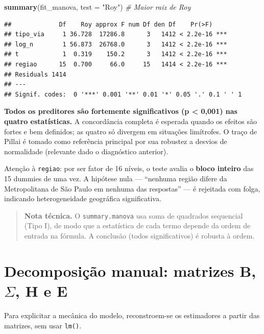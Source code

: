 \documentclass[
  11pt,
]{article}
\newenvironment{Shaded}{\begin{snugshade}}{\end{snugshade}}
\newcommand{\AttributeTok}[1]{\textcolor[rgb]{0.13,0.29,0.53}{#1}}
\newcommand{\CommentTok}[1]{\textcolor[rgb]{0.56,0.35,0.01}{\textit{#1}}}
\newcommand{\FunctionTok}[1]{\textcolor[rgb]{0.13,0.29,0.53}{\textbf{#1}}}
\newcommand{\NormalTok}[1]{#1}
\newcommand{\StringTok}[1]{\textcolor[rgb]{0.31,0.60,0.02}{#1}}
\begin{document}
\begin{Shaded}
\begin{Highlighting}[]
\FunctionTok{summary}\NormalTok{(fit\_manova, }\AttributeTok{test =} \StringTok{"Roy"}\NormalTok{)               }\CommentTok{\# Maior raiz de Roy}
\end{Highlighting}
\end{Shaded}

\begin{verbatim}
##             Df    Roy approx F num Df den Df    Pr(>F)    
## tipo_via     1 36.728  17286.8      3   1412 < 2.2e-16 ***
## log_n        1 56.873  26768.0      3   1412 < 2.2e-16 ***
## t            1  0.319    150.2      3   1412 < 2.2e-16 ***
## regiao      15  0.700     66.0     15   1414 < 2.2e-16 ***
## Residuals 1414                                            
## ---
## Signif. codes:  0 '***' 0.001 '**' 0.01 '*' 0.05 '.' 0.1 ' ' 1
\end{verbatim}

\textbf{Todos os preditores são fortemente significativos (p \textless{}
0,001) nas quatro estatísticas.} A concordância completa é esperada
quando os efeitos são fortes e bem definidos; as quatro só divergem em
situações limítrofes. O traço de Pillai é tomado como referência
principal por sua robustez a desvios de normalidade (relevante dado o
diagnóstico anterior).

Atenção à \texttt{regiao}: por ser fator de 16 níveis, o teste avalia o
\textbf{bloco inteiro} das 15 dummies de uma vez. A hipótese nula ---
``nenhuma região difere da Metropolitana de São Paulo em nenhuma das
respostas'' --- é rejeitada com folga, indicando heterogeneidade
geográfica significativa.

\begin{quote}
\textbf{Nota técnica.} O \texttt{summary.manova} usa soma de quadrados
sequencial (Tipo I), de modo que a estatística de cada termo depende da
ordem de entrada na fórmula. A conclusão (todos significativos) é
robusta à ordem.
\end{quote}

\newpage

\section{\texorpdfstring{Decomposição manual: matrizes B, \(\Sigma\), H
e
E}{Decomposição manual: matrizes B, \textbackslash Sigma, H e E}}\label{decomposiuxe7uxe3o-manual-matrizes-b-sigma-h-e-e}

Para explicitar a mecânica do modelo, reconstroem-se os estimadores a
partir das matrizes, sem usar \texttt{lm()}.
\end{document}
